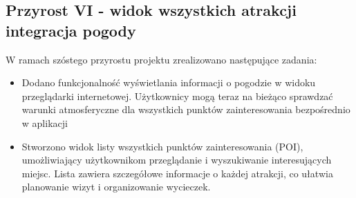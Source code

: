     \subsection{Przyrost VI - widok wszystkich atrakcji integracja pogody}
    \label{sec:przyrost6}

    W ramach szóstego przyrostu projektu zrealizowano następujące zadania:
    \begin{itemize}
        \item  Dodano funkcjonalność wyświetlania informacji o pogodzie w widoku przeglądarki internetowej. 
        Użytkownicy mogą teraz na bieżąco sprawdzać warunki atmosferyczne dla wszystkich punktów zainteresowania bezpośrednio w aplikacji
        \item Stworzono widok listy wszystkich punktów zainteresowania (POI), umożliwiający użytkownikom przeglądanie i wyszukiwanie interesujących miejsc. 
        Lista zawiera szczegółowe informacje o każdej atrakcji, co ułatwia planowanie wizyt i organizowanie wycieczek.
    \end{itemize}

